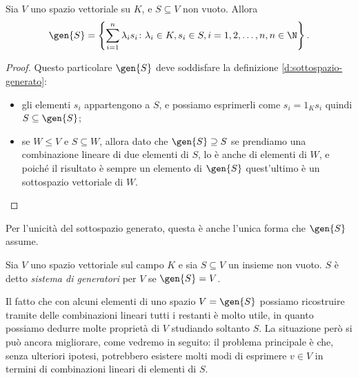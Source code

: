 \begin{teorema}
	Sia $V$ uno spazio vettoriale su $K$, e $S\subseteq V$ non vuoto.
	Allora
	\begin{equation*}
		\gen{S}=\left\{\sum_{i=1}^n\lambda_i s_i\colon \lambda_i\in K, s_i\in S, i=1,2,\dots,n, n\in\N\right\}.
	\end{equation*}
\end{teorema}
\begin{proof}
	Questo particolare $\gen{S}$ deve soddisfare la definizione \ref{d:sottospazio-generato}:
	\begin{itemize}
		\item gli elementi $s_i$ appartengono a $S$, e possiamo esprimerli come $s_i=1_Ks_i$ quindi $S\subseteq\gen{S}$;
		\item se $W\leq V$ e $S\subseteq W$, allora dato che $\gen{S}\supseteq S$ se prendiamo una combinazione lineare di due elementi di $S$, lo è anche di elementi di $W$, e poiché il risultato è sempre un elemento di $\gen{S}$ quest'ultimo è un sottospazio vettoriale di $W$.\qedhere
	\end{itemize}
\end{proof}
Per l'unicità del sottospazio generato, questa è anche l'unica forma che $\gen{S}$ assume.

\begin{definizione}
	Sia $V$ uno spazio vettoriale sul campo $K$ e sia $S\subseteq V$ un insieme non vuoto.
	$S$ è detto \emph{sistema di generatori} per $V$ se $\gen{S}=V$.
\end{definizione}
Il fatto che con alcuni elementi di uno spazio $V=\gen{S}$ possiamo ricostruire tramite delle combinazioni lineari tutti i restanti è molto utile, in quanto possiamo dedurre molte proprietà di $V$ studiando soltanto $S$.
La situazione però si può ancora migliorare, come vedremo in seguito: il problema principale è che, senza ulteriori ipotesi, potrebbero esistere molti modi di esprimere $v\in V$ in termini di combinazioni lineari di elementi di $S$.
